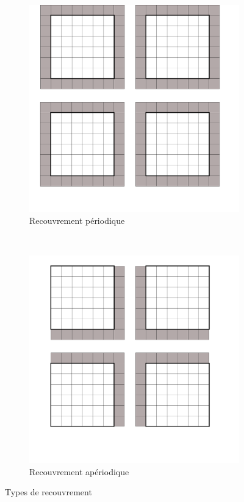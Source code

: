 \begin{figure}[!ht]
  \centering
  \begin{subfigure}[b]{0.5\textwidth}
    \centering
    \includegraphics[scale=0.12]{figures/domain_per.png}
    \caption{\label{fig:per_overlap}Recouvrement périodique}
  \end{subfigure}%
  ~
  \begin{subfigure}[b]{0.5\textwidth}
    \centering
    \includegraphics[scale=0.12]{figures/domain_aper.png}
    \caption{\label{fig:aper_overlap}Recouvrement apériodique}
  \end{subfigure}
  \caption{\label{fig:overlap_type}Types de recouvrement}
\end{figure}

